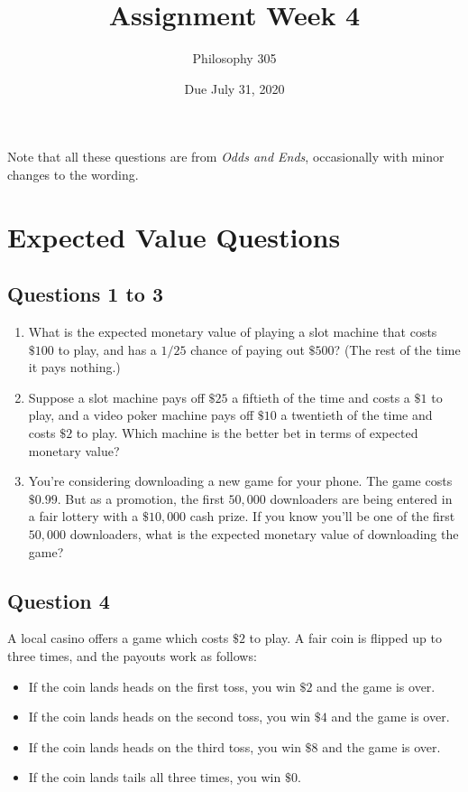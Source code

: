 \documentclass[11pt,]{article}
\title{Assignment Week 4}
\author{Philosophy 305}
\date{Due July 31, 2020}
\providecommand{\tightlist}{%
  \setlength{\itemsep}{0pt}\setlength{\parskip}{0pt}}
\begin{document}
\maketitle

Note that all these questions are from \emph{Odds and Ends},
occasionally with minor changes to the wording.

\hypertarget{expected-value-questions}{%
\section{Expected Value Questions}\label{expected-value-questions}}

\hypertarget{questions-1-to-3}{%
\subsection{Questions 1 to 3}\label{questions-1-to-3}}

\begin{enumerate}
\def\labelenumi{\arabic{enumi}.}
\tightlist
\item
  What is the expected monetary value of playing a slot machine that
  costs \(\$100\) to play, and has a \(1/25\) chance of paying out
  \(\$500\)? (The rest of the time it pays nothing.)
\item
  Suppose a slot machine pays off \(\$25\) a fiftieth of the time and
  costs a \(\$1\) to play, and a video poker machine pays off \(\$10\) a
  twentieth of the time and costs \(\$2\) to play. Which machine is the
  better bet in terms of expected monetary value?
\item
  You're considering downloading a new game for your phone. The game
  costs \(\$0.99\). But as a promotion, the first \(50,000\) downloaders
  are being entered in a fair lottery with a \(\$10,000\) cash prize. If
  you know you'll be one of the first \(50,000\) downloaders, what is
  the expected monetary value of downloading the game?
\end{enumerate}

\hypertarget{question-4}{%
\subsection{Question 4}\label{question-4}}

A local casino offers a game which costs \(\$2\) to play. A fair coin is
flipped up to three times, and the payouts work as follows:

\begin{itemize}
\tightlist
\item
  If the coin lands heads on the first toss, you win \(\$2\) and the
  game is over.
\item
  If the coin lands heads on the second toss, you win \(\$4\) and the
  game is over.
\item
  If the coin lands heads on the third toss, you win \(\$8\) and the
  game is over.
\item
  If the coin lands tails all three times, you win \(\$0\).
\end{itemize}
\end{document}
